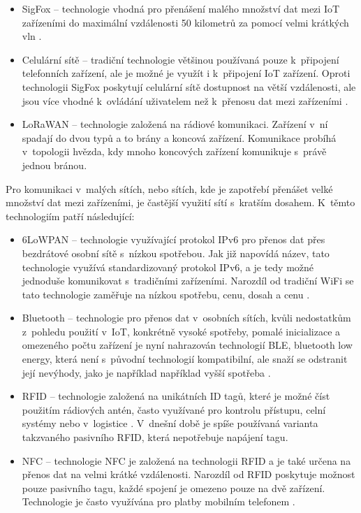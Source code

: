 \begin{itemize}
\item SigFox -- technologie vhodná pro přenášení malého množství dat mezi IoT zařízeními do maximální vzdálenosti 50 kilometrů za pomocí velmi krátkých vln \cite{8079928}.

\item Celulární sítě -- tradiční technologie většinou používaná pouze k~připojení telefonních zařízení, ale je možné je využít i k~připojení IoT zařízení. Oproti technologii SigFox poskytují celulární sítě dostupnost na větší vzdálenosti, ale jsou více vhodné k~ovládání uživatelem než k~přenosu dat mezi zařízeními \cite{8079928}.

\item LoRaWAN -- technologie založená na rádiové komunikaci. Zařízení v~ní spadají do dvou typů a to brány a koncová zařízení. Komunikace probíhá v~topologii hvězda, kdy mnoho koncových zařízení komunikuje s~právě jednou bránou. \cite{s18113995}
\end{itemize}

Pro komunikaci v~malých sítích, nebo sítích, kde je zapotřebí přenášet velké množství dat mezi zařízeními, je častější využití sítí s~kratším dosahem. K~těmto technologiím patří následující:

\begin{itemize}

\item 6LoWPAN -- technologie využívající protokol IPv6 pro přenos dat přes bezdrátové osobní sítě s~nízkou spotřebou. Jak již napovídá název, tato technologie využívá standardizovaný protokol IPv6, a je tedy možné jednoduše komunikovat s~tradičními zařízeními. Narozdíl od tradiční WiFi se tato technologie zaměřuje na nízkou spotřebu, cenu, dosah a cenu \cite{rfc4919}.

\item Bluetooth -- technologie pro přenos dat v~osobních sítích, kvůli nedostatkům z~pohledu použití v~IoT, konkrétně vysoké spotřeby, pomalé inicializace a omezeného počtu zařízení je nyní nahrazován technologií BLE, bluetooth low energy, která není s~původní technologií kompatibilní, ale snaží se odstranit její nevýhody, jako je například například vyšší spotřeba \cite{7368748}.
\item RFID -- technologie založená na unikátních ID tagů, které je možné číst použitím rádiových antén, často využívané pro kontrolu přístupu, celní systémy nebo v~logistice \cite{10.1007/11687238_36}. V~dnešní době je spíše používaná varianta takzvaného pasivního RFID, která nepotřebuje napájení tagu.
\item NFC -- technologie NFC je založená na technologii RFID a je také určena na přenos dat na velmi krátké vzdálenosti. Narozdíl od RFID poskytuje možnost pouze pasivního tagu, každé spojení je omezeno pouze na dvě zařízení. Technologie je často využívána pro platby mobilním telefonem \cite{coskun2011near}.
\end{itemize}

